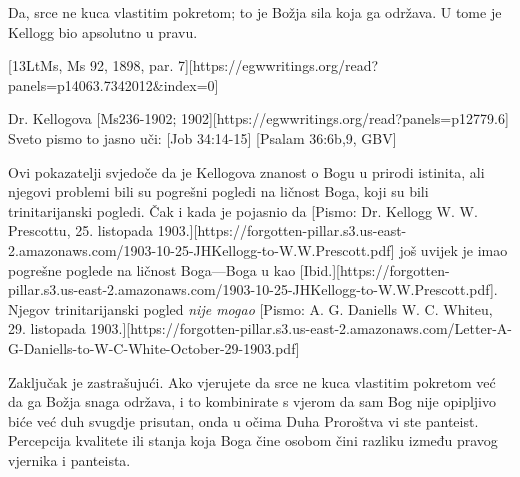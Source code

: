 Da, srce ne kuca vlastitim pokretom; to je Božja sila koja ga održava. U tome je Kellogg bio apsolutno u pravu.

[13LtMs, Ms 92, 1898, par. 7][https://egwwritings.org/read?panels=p14063.7342012&index=0]

Dr. Kellogova [Ms236-1902; 1902][https://egwwritings.org/read?panels=p12779.6] Sveto pismo to jasno uči: [Job 34:14-15] [Psalam 36:6b,9, GBV]

Ovi pokazatelji svjedoče da je Kellogova znanost o Bogu u prirodi istinita, ali njegovi problemi bili su pogrešni pogledi na ličnost Boga, koji su bili trinitarijanski pogledi. Čak i kada je pojasnio da [Pismo: Dr. Kellogg W. W. Prescottu, 25. listopada 1903.][https://forgotten-pillar.s3.us-east-2.amazonaws.com/1903-10-25-JHKellogg-to-W.W.Prescott.pdf] još uvijek je imao pogrešne poglede na ličnost Boga—Boga u  kao [Ibid.][https://forgotten-pillar.s3.us-east-2.amazonaws.com/1903-10-25-JHKellogg-to-W.W.Prescott.pdf]. Njegov trinitarijanski pogled \textit{nije mogao} [Pismo: A. G. Daniells W. C. Whiteu, 29. listopada 1903.][https://forgotten-pillar.s3.us-east-2.amazonaws.com/Letter-A-G-Daniells-to-W-C-White-October-29-1903.pdf]

Zaključak je zastrašujući. Ako vjerujete da srce ne kuca vlastitim pokretom već da ga Božja snaga održava, i to kombinirate s vjerom da sam Bog nije opipljivo biće već duh svugdje prisutan, onda u očima Duha Proroštva vi ste panteist. Percepcija kvalitete ili stanja koja Boga čine osobom čini razliku između pravog vjernika i panteista.

